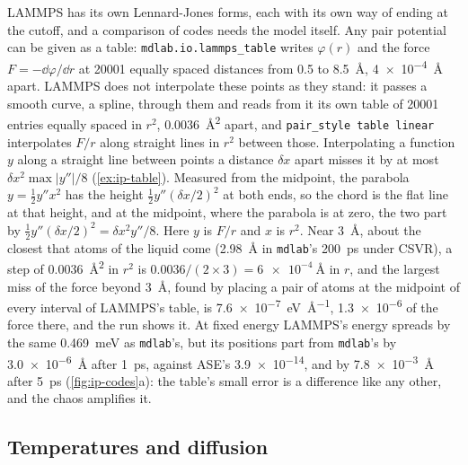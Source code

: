 LAMMPS has its own Lennard-Jones forms, each with its own way of ending at
the cutoff, and a comparison of codes needs the model itself. Any pair
potential can be given as a table: \texttt{mdlab.io.lammps\_table} writes
$\varphi(r)$ and the force $F = -\dd\varphi/\dd r$ at \num{20001} equally
spaced distances from 0.5 to \SI{8.5}{\angstrom}, \SI{4e-4}{\angstrom}
apart. LAMMPS does not interpolate these points as they stand: it passes a
smooth curve, a spline, through them and reads from it its own table of
\num{20001} entries equally spaced in $r^2$,
\SI{0.0036}{\angstrom\squared} apart, and \texttt{pair\_style table
linear} interpolates $F/r$ along straight lines in $r^2$ between those.
Interpolating a function $y$ along a straight line between points a
distance $\delta x$ apart misses it by at most $\delta x^2\max\lvert
y''\rvert/8$ (\cref{ex:ip-table}). Measured from the midpoint, the
parabola $y = \frac12 y''x^2$ has the height $\frac12 y''(\delta x/2)^2$
at both ends, so the chord is the flat line at that height, and at the
midpoint, where the parabola is at zero, the two part by $\frac12
y''(\delta x/2)^2 = \delta x^2 y''/8$. Here $y$ is $F/r$ and $x$ is $r^2$.
Near \SI{3}{\angstrom}, about the closest that atoms of the liquid come
(\SI{2.98}{\angstrom} in \texttt{mdlab}'s \SI{200}{\pico\second} under
CSVR), a step of \SI{0.0036}{\angstrom\squared} in $r^2$ is
$0.0036/(2\times3) = \SI{6e-4}{\angstrom}$ in $r$, and the largest miss of
the force beyond \SI{3}{\angstrom}, found by placing a pair of atoms at
the midpoint of every interval of LAMMPS's table, is
\SI{7.6e-7}{\electronvolt\per\angstrom}, \num{1.3e-6} of the force there,
and the run shows it. At fixed energy LAMMPS's energy spreads by the same
\SI{0.469}{\milli\electronvolt} as \texttt{mdlab}'s, but its positions
part from \texttt{mdlab}'s by \SI{3.0e-6}{\angstrom} after
\SI{1}{\pico\second}, against ASE's \num{3.9e-14}, and by
\SI{7.8e-3}{\angstrom} after \SI{5}{\pico\second} (\cref{fig:ip-codes}a):
the table's small error is a difference like any other, and the chaos
amplifies it.

\subsection*{Temperatures and diffusion}

